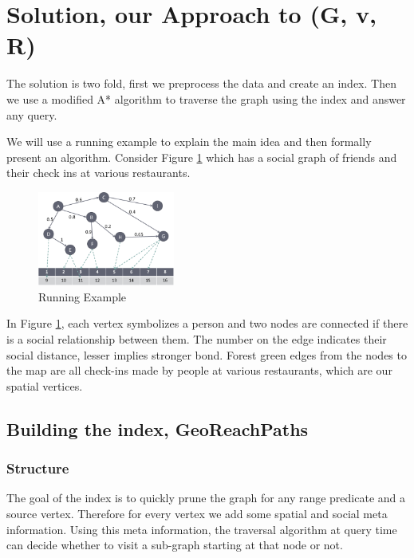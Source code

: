 \section{Solution, our Approach to {\rrp}(G, v, R)} \label{sec:solution}

The solution is two fold, first we preprocess the data and create an index. Then we use a modified A* algorithm to traverse the graph using the index and answer any query.

We will use a running example to explain the main idea and then formally present an algorithm. Consider Figure \ref{fig:running-example-solution} which has a social graph of friends and their check ins at various restaurants.

\begin{figure}[t]
	\centering \includegraphics[width=0.40\textwidth]{images/space_partitioned_world.eps}
    \caption{Running Example}
    \label{fig:running-example-solution}
\end{figure}

In Figure \ref{fig:running-example-solution}, each vertex symbolizes a person and two nodes are connected if there is a social relationship between them. The number on the edge indicates their social distance, lesser implies stronger bond. Forest green edges from the nodes to the map are all check-ins made by people at various restaurants, which are our spatial vertices.

\subsection{Building the index, GeoReachPaths}

\subsubsection{Structure}
The goal of the index is to quickly prune the graph for any range predicate and a source vertex. Therefore for every vertex we add some spatial and social meta information. Using this meta information, the traversal algorithm at query time can decide whether to visit a sub-graph starting at that node or not.

